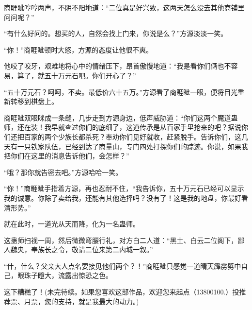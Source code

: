\begin{this_body}
商睚眦哼哼两声，不阴不阳地道：“二位真是好兴致，这两天怎么没去其他商铺里问问呢？”

“有什么好问的。想买的人，自然会找上门来，你说是么？”方源淡淡一笑。

“你！”商睚眦顿时大怒，方源的态度让他很不爽。

他咬了咬牙，艰难地将心中的情绪压下，昂首傲慢地道：“我是看你们俩也不容易，算了，就五十万元石吧。你们开心了？”

“五十万元石？呵呵，不卖。最低价六十五万。”方源看了商睚眦一眼，便将目光重新转移到棋盘上。

商睚眦双眼眯成一条缝，几步走到方源身边，低声威胁道：“你们这两个魔道蛊师，还在装！我早就查过你们的底细了，这道传承是从百家手里抢来的吧？据说你们还把百家的两个少族长都杀死？奉劝你们见好就收，赶紧脱手。告诉你们，这几天有一只铁家队伍，已经到达了商量山，专门四处打探你们的踪迹。你说，如果我把你们在这里的消息告诉他们，会怎样？”

“哦？那你就告密去吧。”方源哈哈一笑。

“你！”商睚眦手指着方源，再也忍耐不住，“我告诉你，五十万元石已经可以显示我的诚意。你除了卖给我，还能有其他选择吗？没有了！这是我的地盘，你最好看清形势。”

就在此时，一道光从天而降，化为一名蛊师。

这蛊师扫视一周，然后微微弯腰行礼，对方白二人道：“黑土、白云二位阁下，鄙人魏央，奉族长之令，敬请二位来第二内城一叙。”

“什，什么？父亲大人点名要接见他们两个？！”商睚眦只感觉一道晴天霹雳劈中自己，眼珠子瞪大，流露出惊恐之色。

这下糟糕了！(未完待续。如果您喜欢这部作品，欢迎您来起点（13800100.）投推荐票、月票，您的支持，就是我最大的动力。)

\end{this_body}

